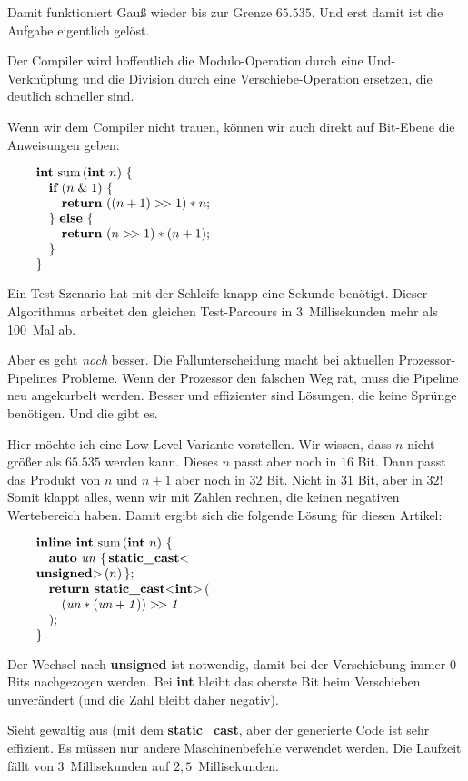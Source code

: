 \noindent Damit funktioniert Gauß wieder bis zur Grenze $65.535$.
Und erst damit ist die Aufgabe eigentlich gelöst.

Der Compiler wird hoffentlich die Modulo-Operation durch eine
Und-Verknüpfung und die Division durch eine
Verschiebe-Operation ersetzen, die deutlich schneller sind.

Wenn wir dem Compiler nicht trauen, können wir auch direkt
auf Bit-Ebene die Anweisungen geben:

$$\vbox{\obeylines
{\bf int} sum$\,$({\bf int} $n$) $\{$
\quad {\bf if} ($n \mathrel\& 1$) $\{$
\qquad {\bf return} $((n + 1) >\!> 1) * n$;
\quad $\}$ {\bf else} $\{$
\qquad {\bf return} $(n >\!> 1) * (n + 1)$;
\quad $\}$
$\}$}$$

\noindent Ein Test-Szenario hat mit der Schleife knapp eine Sekunde benötigt.
Dieser Algorithmus arbeitet den gleichen Test-Parcours in 3~Millisekunden
mehr als 100~Mal ab.

Aber es geht {\it noch\/} besser.
Die Fallunterscheidung macht bei aktuellen Prozessor-Pipelines
Probleme.
Wenn der Prozessor den falschen Weg rät, muss die
Pipeline neu angekurbelt werden.
Besser und effizienter sind Lösungen, die keine
Sprünge benötigen.
Und die gibt es.

Hier möchte ich eine Low-Level Variante vorstellen.
Wir wissen, dass $n$ nicht größer als $65.535$ werden
kann.
Dieses $n$ passt aber noch in $16$ Bit.
Dann passt das Produkt von $n$ und $n+1$ aber noch in
$32$ Bit.
Nicht in $31$ Bit, aber in $32$!
Somit klappt alles, wenn wir mit Zahlen rechnen, die
keinen negativen Wertebereich haben.
Damit ergibt sich die folgende Lösung für diesen Artikel:

$$\vbox{\obeylines
{\bf inline int} sum$\,$({\bf int} $n$) $\{$
\quad {\bf auto} $\it un$ $\{\,${\bf static\_cast}<{\bf unsigned}>$\,$($n$)$\,\}$;
\quad {\bf return static\_cast}<{\bf int}>$\,$(
\qquad $(\it un * (\it un + 1)) >\!> 1$
\quad );
$\}$}$$

\noindent Der Wechsel nach {\bf unsigned} ist notwendig, damit
bei der Verschiebung immer $0$-Bits nachgezogen werden.
Bei {\bf int} bleibt das oberste Bit beim Verschieben unverändert
(und die Zahl bleibt daher negativ).

Sieht gewaltig aus (mit dem {\bf static\_cast}, aber
der generierte Code ist sehr effizient.
Es müssen nur andere Maschinenbefehle verwendet werden.
Die Laufzeit fällt von 3~Millisekunden auf $2{,}5$~Millisekunden.

